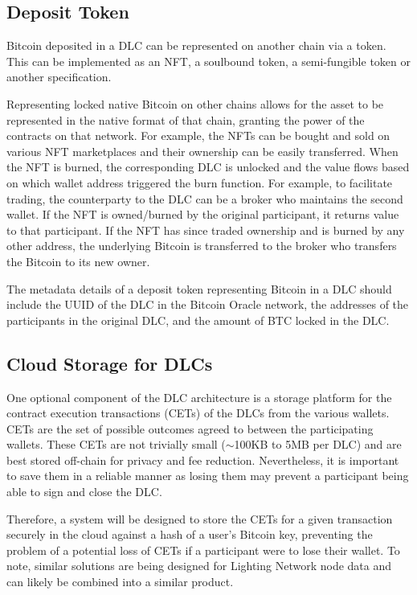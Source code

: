 \documentclass[twoside, a4paper, 11pt]{article}
\begin{document}
  \subsection{Deposit Token}

  Bitcoin deposited in a DLC can be represented on another chain via a token. This can be implemented as an NFT, a soulbound token, a semi-fungible token or another specification.

  Representing locked native Bitcoin on other chains allows for the asset to be represented in the native format of that chain, granting the power of the contracts on that network. For example, the NFTs can be bought and sold on various NFT marketplaces and their ownership can be easily transferred.
  When the NFT is burned, the corresponding DLC is unlocked and the value flows based on which wallet address triggered the burn function. For example, to facilitate trading, the counterparty to the DLC can be a broker who maintains the second wallet. If the NFT is owned/burned by the original participant, it returns value to that participant. If the NFT has since traded ownership and is burned by any other address, the underlying Bitcoin is transferred to the broker who transfers the Bitcoin to its new owner.

  The metadata details of a deposit token representing Bitcoin in a DLC should include the UUID of the DLC in the Bitcoin Oracle network, the addresses of the participants in the original DLC, and the amount of BTC locked in the DLC.

  \subsection{Cloud Storage for DLCs}

  One optional component of the DLC architecture is a storage platform for the contract execution transactions (CETs) of the DLCs from the various wallets. CETs are the set of possible outcomes agreed to between the participating wallets. These CETs are not trivially small ($\sim$100KB to 5MB per DLC) and are best stored off-chain for privacy and fee reduction. Nevertheless, it is important to save them in a reliable manner as losing them may prevent a participant being able to sign and close the DLC.

  Therefore, a system will be designed to store the CETs for a given transaction securely in the cloud against a hash of a user’s Bitcoin key, preventing the problem of a potential loss of CETs if a participant were to lose their wallet. To note, similar solutions are being designed for Lighting Network node data and can likely be combined into a similar product.
\end{document}
